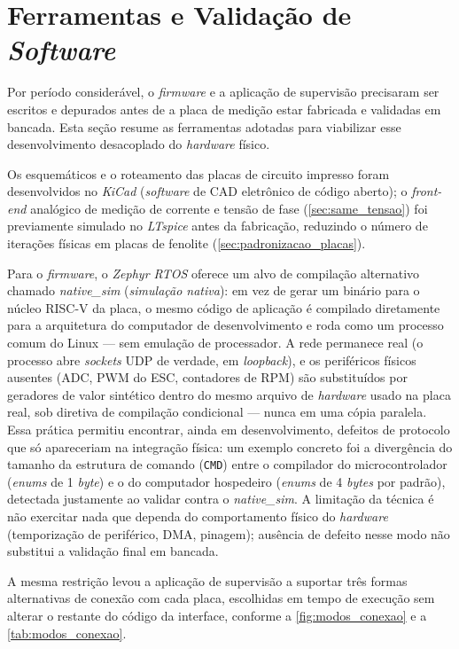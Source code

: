 \section{Ferramentas e Validação de \textit{Software}}
\label{sec:ferramentas_software}

Por período considerável, o \textit{firmware} e a aplicação de supervisão
precisaram ser escritos e depurados antes de a placa de medição estar
fabricada e validadas em bancada. Esta seção resume as ferramentas adotadas
para viabilizar esse desenvolvimento desacoplado do \textit{hardware} físico.

Os esquemáticos e o roteamento das placas de circuito impresso foram
desenvolvidos no \textit{KiCad} (\textit{software} de CAD eletrônico de código
aberto); o \textit{front-end} analógico de medição de corrente e tensão de
fase (\autoref{sec:same_tensao}) foi previamente simulado no
\textit{LTspice} antes da fabricação, reduzindo o número de iterações físicas
em placas de fenolite (\autoref{sec:padronizacao_placas}).

Para o \textit{firmware}, o \textit{Zephyr RTOS} oferece um alvo de compilação
alternativo chamado \textit{native\_sim} (\textit{simulação nativa}): em vez de
gerar um binário para o núcleo RISC-V da placa, o mesmo código de aplicação é
compilado diretamente para a arquitetura do computador de desenvolvimento e
roda como um processo comum do Linux --- sem emulação de processador. A rede
permanece real (o processo abre \textit{sockets} UDP de verdade, em
\textit{loopback}), e os periféricos físicos ausentes (ADC, PWM do ESC,
contadores de RPM) são substituídos por geradores de valor sintético dentro do
mesmo arquivo de \textit{hardware} usado na placa real, sob diretiva de
compilação condicional --- nunca em uma cópia paralela. Essa prática permitiu
encontrar, ainda em desenvolvimento, defeitos de protocolo que só apareceriam
na integração física: um exemplo concreto foi a divergência do tamanho da
estrutura de comando (\texttt{CMD}) entre o compilador do microcontrolador
(\textit{enums} de 1 \textit{byte}) e o do computador hospedeiro (\textit{enums}
de 4 \textit{bytes} por padrão), detectada justamente ao validar contra o
\textit{native\_sim}. A limitação da técnica é não exercitar nada que dependa
do comportamento físico do \textit{hardware} (temporização de periférico, DMA,
pinagem); ausência de defeito nesse modo não substitui a validação final em
bancada.

A mesma restrição levou a aplicação de supervisão a suportar três formas
alternativas de conexão com cada placa, escolhidas em tempo de execução sem
alterar o restante do código da interface, conforme a
\autoref{fig:modos_conexao} e a \autoref{tab:modos_conexao}.

